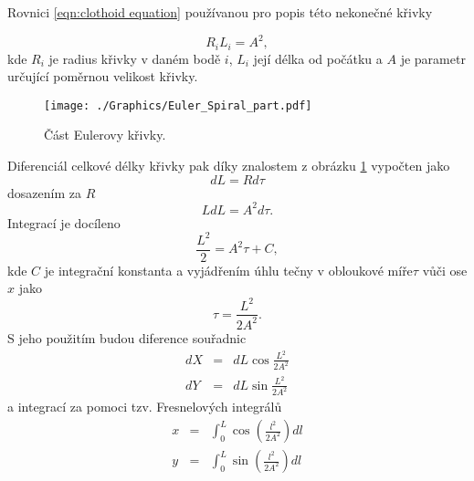 \documentclass[czech, bc, kky, he, iso690numb]{fasthesis}
\begin{document}
                Rovnici \ref{eqn:clothoid equation} používanou pro popis této nekonečné křivky 
                    
                    \begin{equation}
                        R_{i}L_{i} = A^{2},
                        \label{eqn:clothoid equation}
                    \end{equation}
                 kde \(R_{i}\) je radius křivky v daném bodě \(i\), \(L_{i}\) její délka od počátku a \(A\) je parametr určující poměrnou velikost křivky.
                 	\begin{figure}[h]
                 		\centering
                 		\texttt{[image: ./Graphics/Euler\_Spiral\_part.pdf]}
                 		\caption{Část Eulerovy křivky.}
                 		\label{pic:Eulerova_krivka_cast}
                 	\end{figure}
                 Diferenciál celkové délky křivky pak díky znalostem z obrázku \ref{pic:Eulerova_krivka_cast} vypočten jako
                    \begin{equation}
                        d L = R d\tau
                    \end{equation}
                dosazením za \(R\)
                    \begin{equation}
                        L d L = A^{2}d\tau.
                    \end{equation}
                Integrací je docíleno
                    \begin{equation}
                        \frac{L^{2}}{2} = A^{2}\tau + C,
                    \end{equation}
                kde \(C\) je integrační konstanta a vyjádřením úhlu tečny v obloukové míře\(\tau\) vůči ose \(x\) jako
                    \begin{equation}
                        \tau = \frac{L^{2}}{2A^{2}}.
                    \end{equation}
                S jeho použitím budou diference souřadnic
                    \begin{eqnarray}
                        d X & = & d L\cos{\frac{L^{2}}{2A^{2}}}\\
                        d Y & = & d L\sin{\frac{L^{2}}{2A^{2}}}
                    \end{eqnarray}
                a integrací za pomoci tzv. Fresnelových integrálů
                    \begin{eqnarray}
                        x & = & \int_{0}^{L}\cos(\frac{l^{2}}{2A^{2}})dl\\
                        y & = &\int_{0}^{L}\sin(\frac{l^{2}}{2A^{2}})dl
                    \end{eqnarray}
\end{document}

